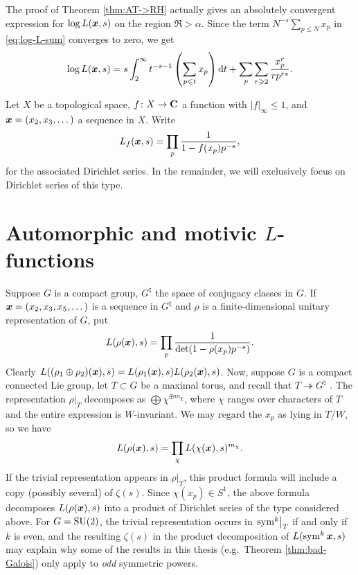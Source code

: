 The proof of Theorem \ref{thm:AT->RH} actually gives an absolutely 
convergent expression for $\log L({\boldsymbol x},s)$ on the region $\Re >\alpha$. Since 
the term $N^{-s} \sum_{p\leqslant N} x_p$ in \eqref{eq:log-L-sum} 
converges to zero, we get 
\[
	\log L({\boldsymbol x},s) = s \int_2^\infty t^{-s-1}\left(\sum_{p\leqslant t} x_p\right) \mathrm{d} t + \sum_p \sum_{r\geqslant 2} \frac{x_p^r}{r p^{r s}} . 
\]

Let $X$ be a topological space, $f\colon X\to \mathbf{C}$ a function with 
$|f|_\infty\leqslant 1$, and ${\boldsymbol x}=(x_2,x_3,\dots)$ a sequence in $X$. Write 
\[
	L_f({\boldsymbol x},s) = \prod_p \frac{1}{1-f(x_p) p^{-s}} ,
\]
for the associated Dirichlet series. In the remainder, we will 
exclusively focus on Dirichlet series of this type. 





\section{Automorphic and motivic \texorpdfstring{$L$}{L}-functions}

Suppose $G$ is a compact group, $G^\natural$ the space of conjugacy classes in 
$G$. If ${\boldsymbol x} = (x_2,x_3,x_5,\dots)$ is a sequence in $G^\natural$ and $\rho$ is 
a finite-dimensional unitary representation of $G$, put 
\[
	L(\rho({\boldsymbol x}),s) = \prod_p \frac{1}{\det(1-\rho(x_p) p^{-s})} .
\]
Clearly $L((\rho_1\oplus \rho_2)({\boldsymbol x}),s) = L(\rho_1({\boldsymbol x}),s) L(\rho_2({\boldsymbol x}),s)$. 
Now, suppose $G$ is a compact connected Lie group, let $T\subset G$ be a 
maximal torus, and recall that 
$T\twoheadrightarrow G^\natural$ \cite[IX.5 Prop.~5]{bourbaki-2005}. 
The representation 
$\left.\rho\right|_T$ decomposes as $\bigoplus \chi^{\oplus m_\chi}$, where 
$\chi$ ranges over characters of $T$ and the entire expression is 
$W$-invariant. We may regard the $x_p$ as lying in $T/W$, so we have 
\[
	L(\rho({\boldsymbol x}),s) = \prod_\chi L(\chi({\boldsymbol x}),s)^{m_\chi} .
\]
If the trivial representation appears in $\left.\rho\right|_T$, this product 
formula will include a copy (possibly several) of $\zeta(s)$. Since 
$\chi(x_p) \in S^1$, the above formula decomposes $L(\rho({\boldsymbol x}),s)$ into a 
product of Dirichlet series of the type considered above. For $G = \operatorname{SU}(2)$, the 
trivial representation occurs in $\left.\operatorname{sym}^k \right|_T$ if and only if $k$ is 
even, and the resulting $\zeta(s)$ in the product decomposition of 
$L(\operatorname{sym}^k {\boldsymbol x},s)$ may explain why some of the results in this thesis 
(e.g.~Theorem \ref{thm:bad-Galois}) only apply 
to \emph{odd} symmetric powers. 

